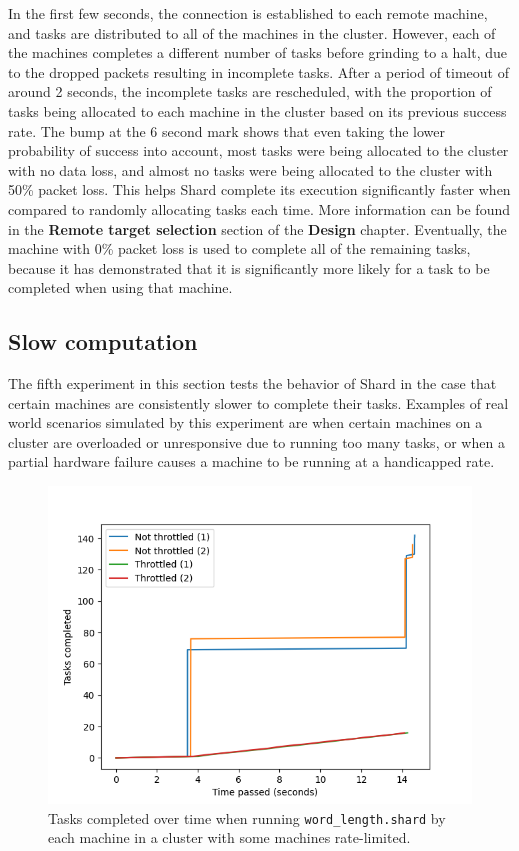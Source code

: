 \documentclass[oneside]{report}
\begin{document}
In the first few seconds, the connection is established to each remote machine, and tasks are distributed to all of the machines in the cluster.
However, each of the machines completes a different number of tasks before grinding to a halt, due to the dropped packets resulting in incomplete tasks.
After a period of timeout of around 2 seconds, the incomplete tasks are rescheduled, with the proportion of tasks being allocated to each machine in the cluster based on its previous success rate.
The bump at the 6 second mark shows that even taking the lower probability of success into account, most tasks were being allocated to the cluster with no data loss, and almost no tasks were being allocated to the cluster with 50\% packet loss.
This helps Shard complete its execution significantly faster when compared to randomly allocating tasks each time.
More information can be found in the \textbf{Remote target selection} section of the \textbf{Design} chapter.
Eventually, the machine with 0\% packet loss is used to complete all of the remaining tasks, because it has demonstrated that it is significantly more likely for a task to be completed when using that machine.

\subsection{Slow computation}
The fifth experiment in this section tests the behavior of Shard in the case that certain machines are consistently slower to complete their tasks.
Examples of real world scenarios simulated by this experiment are when certain machines on a cluster are overloaded or unresponsive due to running too many tasks, or when a partial hardware failure causes a machine to be running at a handicapped rate.

\begin{figure}[h]
  \begin{center}
    \includegraphics[scale=0.9]{img/experiments/e11_1620960581241.png}
    \caption{Tasks completed over time when running \texttt{word\_length.shard} by each machine in a cluster with some machines rate-limited.}
    \label{fig:slowwordlength}
  \end{center}
\end{figure}
\end{document}

